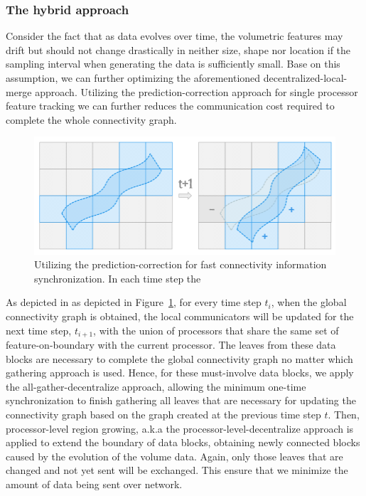 \documentclass[10pt, conference, compsocconf]{IEEEtran}
\begin{document}
\subsubsection{The hybrid approach}

Consider the fact that as data evolves over time, the volumetric features may drift but should not change drastically in neither size, shape nor location if the sampling interval when generating the data is sufficiently small. Base on this assumption, we can further optimizing the aforementioned decentralized-local-merge approach. Utilizing the prediction-correction approach for single processor feature tracking we can further reduces the communication cost required to complete the whole connectivity graph.

\begin{figure}[ht]
	\centering
	\includegraphics[width=1\linewidth]{hybrid.png}
	\caption{Utilizing the prediction-correction for fast connectivity information synchronization. In each time step the }
	\label{fig:hybrid}
\end{figure}

As depicted in as depicted in Figure~\ref{fig:hybrid}, for every time step $t_i$, when the global connectivity graph is obtained, the local communicators will be updated for the next time step, $t_{i+1}$, with the union of processors that share the same set of feature-on-boundary with the current processor. The leaves from these data blocks are necessary to complete the global connectivity graph no matter which gathering approach is used. Hence, for these must-involve data blocks, we apply the all-gather-decentralize approach, allowing the minimum one-time synchronization to finish gathering all leaves that are necessary for updating the connectivity graph based on the graph created at the previous time step $t$. Then, processor-level region growing, a.k.a the processor-level-decentralize approach is applied to extend the boundary of data blocks, obtaining newly connected blocks caused by the evolution of the volume data. Again, only those leaves that are changed and not yet sent will be exchanged. This ensure that we minimize the amount of data being sent over network.
\end{document}

